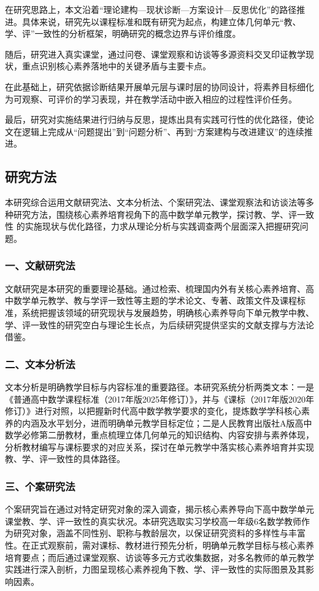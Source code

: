 \documentclass[UTF8,a4paper,12pt,twoside]{ctexart}
\begin{document}
在研究思路上，本文沿着“理论建构—现状诊断—方案设计—反思优化”的路径推进。具体来说，研究先以课程标准和既有研究为起点，构建立体几何单元“教、学、评”一致性的分析框架，明确研究的概念边界与评价维度。

随后，研究进入真实课堂，通过问卷、课堂观察和访谈等多源资料交叉印证教学现状，重点识别核心素养落地中的关键矛盾与主要卡点。

在此基础上，研究依据诊断结果开展单元层与课时层的协同设计，将素养目标细化为可观察、可评价的学习表现，并在教学活动中嵌入相应的过程性评价任务。

最后，研究对实施结果进行归纳与反思，提炼出具有实践可行性的优化路径，使论文在逻辑上完成从“问题提出”到“问题分析”、再到“方案建构与改进建议”的连续推进。

\subsection{研究方法}
本研究综合运用文献研究法、文本分析法、个案研究法、课堂观察法和访谈法等多种研究方法，围绕核心素养培育视角下的高中数学单元教学，探讨教、学、评一致性 的实施现状与优化路径，力求从理论分析与实践调查两个层面深入把握研究问题。

\subsubsection{一、文献研究法}
文献研究是本研究的重要理论基础。通过检索、梳理国内外有关核心素养培育、高中数学单元教学、教与学评一致性等主题的学术论文、专著、政策文件及课程标准，系统把握该领域的研究现状与发展趋势，明确核心素养导向下单元教学中教、学、评一致性的研究空白与理论生长点，为后续研究提供坚实的文献支撑与方法论借鉴。

\subsubsection{二、文本分析法}
文本分析是明确教学目标与内容标准的重要路径。本研究系统分析两类文本：一是《普通高中数学课程标准（2017年版2025年修订）》，并与《课标（2017年版2020年修订）》进行对照，以把握新时代高中数学教学要求的变化，提炼数学学科核心素养的内涵及水平划分，进而明确单元教学目标定位；二是人民教育出版社A版高中数学必修第二册教材，重点梳理立体几何单元的知识结构、内容安排与素养体现，分析教材编写与课标要求的对应关系，探讨在单元教学中落实核心素养培育并实现教、学、评一致性的具体路径。

\subsubsection{三、个案研究法}
个案研究旨在通过对特定研究对象的深入调查，揭示核心素养导向下高中数学单元课堂教、学、评一致性的真实状况。本研究选取实习学校高一年级6名数学教师作为研究对象，涵盖不同性别、职称与教龄层次，以保证研究资料的多样性与丰富性。在正式观察前，需对课标、教材进行预先分析，明确单元教学目标与核心素养培育要点；而后通过课堂观察、访谈等多元方式收集数据，对多名教师的单元教学实践进行深入剖析，力图呈现核心素养视角下教、学、评一致性的实际图景及其影响因素。
\end{document}
